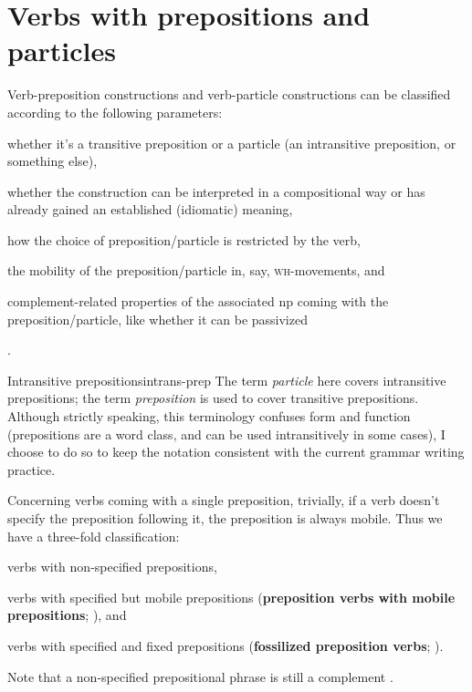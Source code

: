 \documentclass[UTF8, a4paper, oneside, scheme=plain]{ctexrep}
\newcommand*{\citepage}[1]{p.~{#1}}
\newcommand*{\citepages}[1]{pp.~{#1}}
\newcommand*{\concept}[1]{\textbf{#1}}
\newcommand*{\term}[1]{\emph{#1}}
\newcommand{\corpuscat}[1]{\textsc{#1}}
\begin{document}
\section{Verbs with prepositions and particles}

Verb-preposition constructions and verb-particle constructions
can be classified according to the following parameters:
\begin{enumerate*}
    \item whether it's a transitive preposition or a particle 
    (an intransitive preposition, or something else),
    \item whether the construction can be interpreted in a compositional way or 
    has already gained an established (idiomatic) meaning,
    \item how the choice of preposition/particle is restricted by the verb,  
    \item the mobility of the preposition/particle 
    in, say, \corpuscat{wh}-movements, and 
    \item complement-related properties of the associated \acs{np} coming with the preposition/particle,
    like whether it can be passivized
\end{enumerate*}
\citep[\citepages{272-274}]{cgel}.

\begin{infobox}{Intransitive prepositions}{intrans-prep}
    The term \term{particle} here covers intransitive prepositions;
    the term \term{preposition} is used to cover transitive prepositions.
    Although strictly speaking, 
    this terminology confuses form and function 
    (prepositions are a word class, 
    and can be used intransitively in some cases),
    I choose to do so to keep the notation consistent with 
    the current grammar writing practice.
\end{infobox}

Concerning verbs coming with a single preposition,
trivially, if a verb doesn't specify the preposition following it, 
the preposition is always mobile.
Thus we have a three-fold classification:
\begin{enumerate*}
    \item verbs with non-specified prepositions,
    \item verbs with specified but mobile prepositions 
    (\concept{preposition verbs with mobile prepositions}; \citealp[\citepage{273}]{cgel}), and 
    \item verbs with specified and fixed prepositions 
    (\concept{fossilized preposition verbs}; \citealp[\citepage{277}]{cgel}).
\end{enumerate*}
Note that a non-specified prepositional phrase is still a complement \citep[\citepage{273}]{cgel}.
\end{document}
